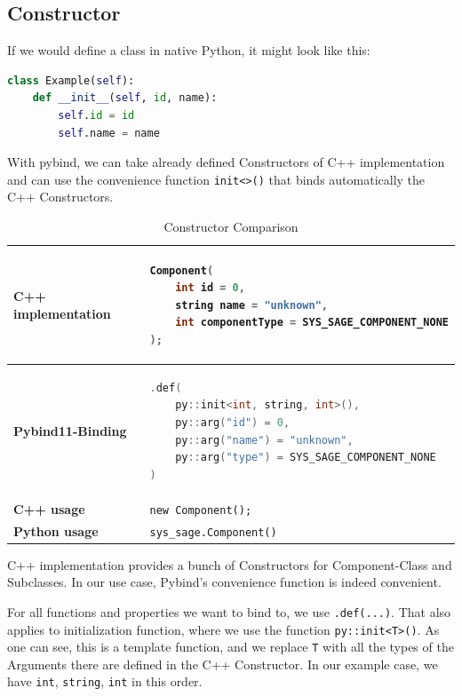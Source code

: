 \subsection{Constructor}

If we would define a class in native Python, it might look like this:

\begin{lstlisting}[language=Python, xleftmargin=4em, frame = single]
class Example(self):
    def __init__(self, id, name):
        self.id = id
        self.name = name
\end{lstlisting}

With pybind, we can take already defined Constructors of C++ implementation and can use the convenience function \verb|init<>()| that binds automatically the C++ Constructors. \cite[see The Basics/Object-Oriented Code]{pybind11-docu}

\begin{table}[htbp]
\centering
\begin{tabular}{|l|l|}
\hline
\textbf{C++ implementation} &
\begin{lstlisting}[language=C++]
Component(
    int id = 0,
    string name = "unknown",
    int componentType = SYS_SAGE_COMPONENT_NONE
);
\end{lstlisting}
\\ \hline
\textbf{Pybind11-Binding} &
\begin{lstlisting}[language=C++]
.def(
    py::init<int, string, int>(),
    py::arg("id") = 0,
    py::arg("name") = "unknown",
    py::arg("type") = SYS_SAGE_COMPONENT_NONE
)
\end{lstlisting}
\\ \hline
\textbf{C++ usage} &
\verb|new Component();| \\ \hline
\textbf{Python usage} &
\verb|sys_sage.Component()| \\ \hline
\end{tabular}
\caption{Constructor Comparison}
\label{tab:constructor}
\end{table}

C++ implementation provides a bunch of Constructors for Component-Class and Subclasses. In our use case, Pybind's convenience function is indeed convenient.

For all functions and properties we want to bind to, we use \verb|.def(...)|. That also applies to initialization function, where we use the function \verb|py::init<T>()|. As one can see, this is a template function, and we replace \verb|T| with all the types of the Arguments there are defined in the C++ Constructor. In our example case, we have \verb|int|, \verb|string|, \verb|int| in this order. \cite[see The Basics/Object-Oriented Code]{pybind11-docu}

